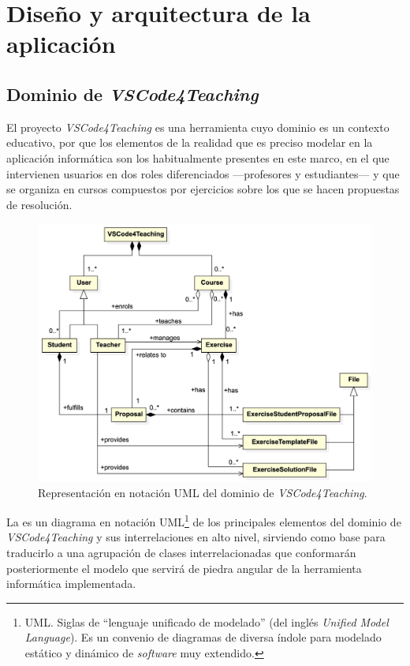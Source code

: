 \section{Diseño y arquitectura de la aplicación}
\label{sec:diseñoArquitectura}

\subsection{Dominio de \textit{VSCode4Teaching}}
\label{subsec:arqDominio}
El proyecto \textit{VSCode4Teaching} es una herramienta cuyo dominio es un contexto educativo, por que los elementos de la realidad que es preciso modelar en la aplicación informática son los habitualmente presentes en este marco, en el que intervienen usuarios en dos roles diferenciados ---profesores y estudiantes--- y que se organiza en cursos compuestos por ejercicios sobre los que se hacen propuestas de resolución.

\begin{figure}[ht]
    \centering
    \includegraphics[width=\textwidth]{imagenes/utilizadas/4-2-arquitectura/diagramas/diag1-dominioAltoNivel.png}
    \caption{Representación en notación UML del dominio de \textit{VSCode4Teaching}.}
    \label{fig:diagDominioAltoNivel}
\end{figure}

La  es un diagrama en notación UML\footnote{UML. Siglas de ``lenguaje unificado de modelado'' (del inglés \textit{Unified Model Language}). Es un convenio de diagramas de diversa índole para modelado estático y dinámico de \textit{software} muy extendido.} de los principales elementos del dominio de \textit{VSCode4Teaching} y sus interrelaciones en alto nivel, sirviendo como base para traducirlo a una agrupación de clases interrelacionadas que conformarán posteriormente el modelo que servirá de piedra angular de la herramienta informática implementada.


